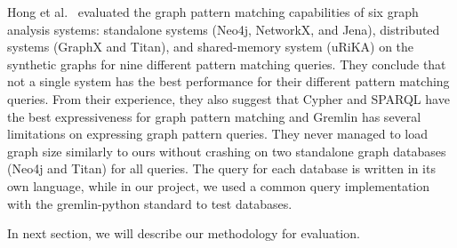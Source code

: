 Hong et al.~\cite{hong2016evaluation} evaluated the graph pattern matching capabilities of six graph analysis systems: standalone systems (Neo4j, NetworkX, and Jena), distributed systems (GraphX and Titan), and shared-memory system (uRiKA) on the synthetic graphs for nine different pattern matching queries. They conclude that not a single system has the best performance for their different pattern matching queries. From their experience, they also suggest that Cypher and SPARQL have the best expressiveness for graph pattern matching and Gremlin has several limitations on expressing graph pattern queries. They never managed to load graph size similarly to ours without crashing on two standalone graph databases (Neo4j and Titan) for all queries. The query for each database is written in its own language, while in our project, we used a common query implementation with the gremlin-python standard to test databases. 

In next section, we will describe our methodology for evaluation. 
